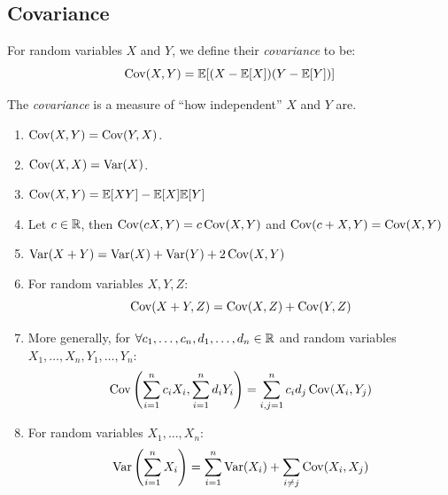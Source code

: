 \documentclass[../main.tex]{subfiles}
\begin{document}
\subsection{Covariance}
\begin{definition}[Covariance]
  For random variables $X$ and $Y$, we define their \textit{covariance} to be:
  \[
    \operatorname{Cov}(X, Y) = \mathbb{E}[(X - \mathbb{E}[X])(Y - \mathbb{E}[Y])]
  \]
\end{definition}
\begin{remark}[Intuition]
  The \textit{covariance} is a measure of ``how independent'' $X$ and $Y$ are.
\end{remark}
\begin{proposition}
  \label{covarianceProperties}
  \begin{enumerate}
    \item $\operatorname{Cov}(X, Y) = \operatorname{Cov}(Y, X)$.
    \item $\operatorname{Cov}(X, X) = \operatorname{Var}(X)$.
    \item $\operatorname{Cov}(X, Y) = \mathbb{E}[XY] - \mathbb{E}[X]\mathbb{E}[Y]$
    \item Let $c \in \mathbb{R}$, then $\operatorname{Cov}(cX, Y) = c\operatorname{Cov}(X, Y)$ and $\operatorname{Cov}(c + X, Y) = \operatorname{Cov}(X, Y)$
    \item $\operatorname{Var}(X + Y) = \operatorname{Var}(X) + \operatorname{Var}(Y) + 2\operatorname{Cov}(X, Y)$
    \item For random variables $X, Y, Z$:
      \[
        \operatorname{Cov}(X + Y, Z) = \operatorname{Cov}(X, Z) + \operatorname{Cov}(Y, Z)
      \]
    \item More generally, for $\forall c_1, \ldots, c_n, d_1, \ldots, d_n \in \mathbb{R}$ and random variables $X_1, \ldots, X_n, Y_1, \ldots, Y_n$:
      \[
        \operatorname{Cov}\left(\sum_{i = 1}^{n} c_iX_i, \sum_{i = 1}^{n} d_i Y_i\right) = \sum_{i, j = 1}^{n} c_id_j \operatorname{Cov}(X_i, Y_j)
      \]
    \item For random variables $X_1, \ldots, X_n$:
      \[
        \operatorname{Var}\left(\sum_{i = 1}^{n} X_i\right) = \sum_{i = 1}^{n} \operatorname{Var}(X_i) + \sum_{i \neq j} \operatorname{Cov}(X_i, X_j)
      \]
  \end{enumerate}
\end{proposition}
\end{document}
